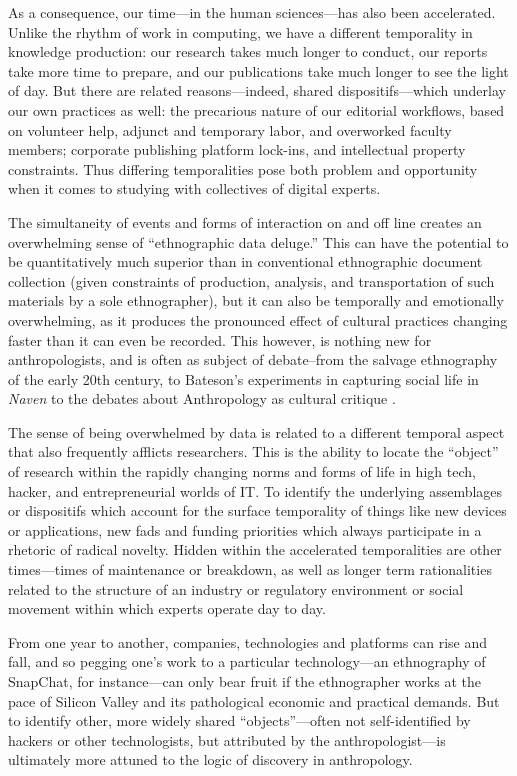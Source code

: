 \documentclass[10pt,letter,oneside]{scrartcl}
\begin{document}
As a consequence, our time---in the human sciences---has also been
accelerated. Unlike the rhythm of work in computing, we
have a different temporality in knowledge production: our research
takes much longer to conduct, our reports take more time to prepare,
and our publications take much longer to see the light of day.  But
there are related reasons---indeed, shared dispositifs---which
underlay our own practices as well: the precarious nature of our
editorial workflows, based on volunteer help, adjunct and temporary
labor, and overworked faculty members; corporate publishing platform
lock-ins, and intellectual property constraints.  Thus differing
temporalities pose both problem and opportunity when it comes to
studying with collectives of digital experts.

The simultaneity of events and forms of interaction on and
off line creates an overwhelming sense of ``ethnographic data
deluge.''  This can have the potential to be quantitatively much superior than in
conventional ethnographic document collection (given constraints of
production, analysis, and transportation of such materials by a sole
ethnographer), but it can also be temporally and emotionally
overwhelming, as it produces the pronounced effect of cultural
practices changing faster than it can even be recorded.  This however, 
is nothing new for anthropologists, and is often as subject of debate--from the
salvage ethnography of the early 20th century, to Bateson's experiments 
in capturing social life in \emph{Naven} \cite{Bateson1958,Marcus1985} 
to the debates about Anthropology as cultural critique 
\cite{Marcus1999a,Clifford1986}.

The sense of being overwhelmed by data is related to a different
temporal aspect that also frequently afflicts researchers.  This
is the ability to locate the ``object'' of research within the rapidly
changing norms and forms of life in high tech, hacker, and
entrepreneurial worlds of IT. To identify the underlying assemblages
or dispositifs \cite{Rabinow2003} which account for the surface
temporality of things like new devices or applications, new fads and
funding priorities which always participate in a rhetoric of radical
novelty.  Hidden within the accelerated temporalities are other
times---times of maintenance or breakdown, as well as longer term
rationalities related to the structure of an industry or regulatory
environment or social movement within which experts operate day to
day.

From one year to another, companies, technologies and platforms can
rise and fall, and so pegging one's work to a particular
technology---an ethnography of SnapChat, for instance---can only bear
fruit if the ethnographer works at the pace of Silicon Valley and its
pathological economic and practical demands.  But to identify other,
more widely shared ``objects''---often not self-identified by hackers
or other technologists, but attributed by the anthropologist---is
ultimately more attuned to the logic of discovery in anthropology.
\end{document}
